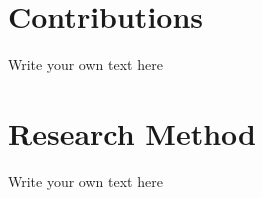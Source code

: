 \documentclass[11pt, a4paper]{article}
\begin{document}
\section*{Contributions}

Write your own text here

\section*{Research Method}

Write your own text here
\end{document}
